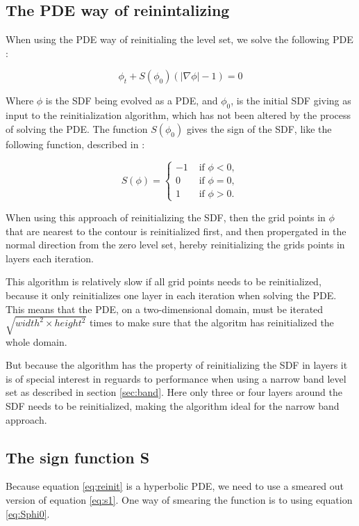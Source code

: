 \subsection{The PDE way of reinintalizing}
When using the PDE way of reinitialing the level set, we solve the
following PDE :

\begin{equation}
\label{eq:reinit}
\phi_t + S(\phi_0)(|\nabla \phi| - 1) = 0
\end{equation}

Where $\phi$ is the SDF being evolved as a PDE, and $\phi_0$, is the
initial SDF giving as input to the reinitialization algorithm, which
has not been altered by the process of solving the PDE. The function
$S(\phi_0)$ gives the sign of the SDF, like the following function,
described in :

\begin{equation}
\label{eq:s1}
S(\phi) =
\begin{cases}
-1 &\mbox{ if } \phi < 0, \\
 0 &\mbox{ if } \phi = 0, \\
 1 &\mbox{ if } \phi > 0.
\end{cases}
\end{equation}

When using this approach of reinitializing the SDF, then the grid
points in $\phi$ that are nearest to the contour is reinitialized
first, and then propergated in the normal direction from the zero
level set, hereby reinitializing the grids points in layers each
iteration.

This algorithm is relatively slow if all grid points needs to be
reinitialized, because it only reinitializes one layer in each
iteration when solving the PDE. This means that the PDE, on a
two-dimensional domain, must be iterated
$\sqrt{width^2 \times height^2}$ times to make sure that the algoritm
has reinitialized the whole domain.

But because the algorithm has the property of reinitializing the SDF
in layers it is of special interest in reguards to performance when
using a narrow band level set as described in section
\vref{sec:band}. Here only three or four layers around the SDF needs
to be reinitialized, making the algorithm ideal for the narrow band
approach.

\subsection{The sign function S}
Because equation \ref{eq:reinit} is a hyperbolic PDE, we need to use a
smeared out version of equation \eqref{eq:s1}. One way of smearing the
function is to using equation \eqref{eq:Sphi0}.

